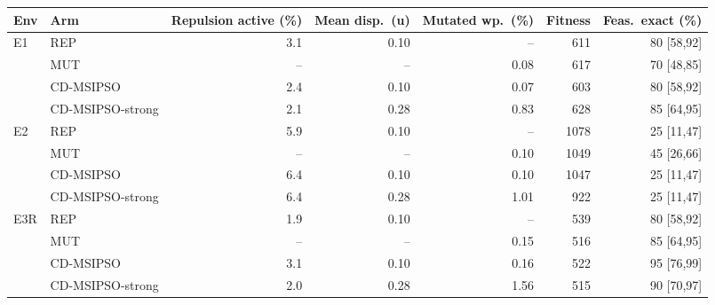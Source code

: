 \begin{tabular}{llrrrrr}
\toprule
Env & Arm & Repulsion active (\%) & Mean disp.\ (u) & Mutated wp.\ (\%) & Fitness & Feas.\ exact (\%)\\
\midrule
E1 & REP & 3.1 & 0.10 & -- & 611 & 80 [58,92]\\
 & MUT & -- & -- & 0.08 & 617 & 70 [48,85]\\
 & CD-MSIPSO & 2.4 & 0.10 & 0.07 & 603 & 80 [58,92]\\
 & CD-MSIPSO-strong & 2.1 & 0.28 & 0.83 & 628 & 85 [64,95]\\
\midrule
E2 & REP & 5.9 & 0.10 & -- & 1078 & 25 [11,47]\\
 & MUT & -- & -- & 0.10 & 1049 & 45 [26,66]\\
 & CD-MSIPSO & 6.4 & 0.10 & 0.10 & 1047 & 25 [11,47]\\
 & CD-MSIPSO-strong & 6.4 & 0.28 & 1.01 & 922 & 25 [11,47]\\
\midrule
E3R & REP & 1.9 & 0.10 & -- & 539 & 80 [58,92]\\
 & MUT & -- & -- & 0.15 & 516 & 85 [64,95]\\
 & CD-MSIPSO & 3.1 & 0.10 & 0.16 & 522 & 95 [76,99]\\
 & CD-MSIPSO-strong & 2.0 & 0.28 & 1.56 & 515 & 90 [70,97]\\
\bottomrule
\end{tabular}